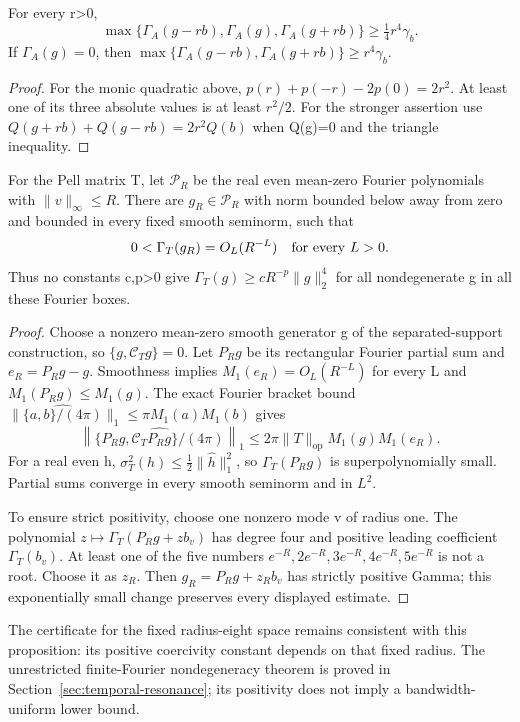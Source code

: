 \begin{proposition}
For every r>0,
\[
 \max\{\Gamma_A(g-rb),\Gamma_A(g),\Gamma_A(g+rb)\}
                    \geq \tfrac14r^4\gamma_b.
\]
If $\Gamma_A(g)=0$, then
$\max\{\Gamma_A(g-rb),\Gamma_A(g+rb)\}\geq r^4\gamma_b$.
\end{proposition}
\begin{proof}
For the monic quadratic above, $p(r)+p(-r)-2p(0)=2r^2$. At least one of its
three absolute values is at least $r^2/2$. For the stronger assertion use
$Q(g+rb)+Q(g-rb)=2r^2Q(b)$ when Q(g)=0 and the triangle inequality.
\end{proof}

\begin{proposition}
For the Pell matrix T, let $\mathcal P_R$ be the real even mean-zero Fourier
polynomials with $\|v\|_\infty\leq R$. There are $g_R\in\mathcal P_R$ with
norm bounded below away from zero and bounded in every fixed smooth seminorm,
such that
\[
             0<\Gamma_T(g_R)=O_L(R^{-L})\quad\hbox{for every }L>0.
\]
Thus no constants c,p>0 give $\Gamma_T(g)\geq cR^{-p}\|g\|_2^4$ for all
nondegenerate g in all these Fourier boxes.
\end{proposition}
\begin{proof}
Choose a nonzero mean-zero smooth generator g of the separated-support
construction, so $\{g,\mathcal C_Tg\}=0$. Let $P_Rg$ be its rectangular
Fourier partial sum and $e_R=P_Rg-g$. Smoothness implies
$M_1(e_R)=O_L(R^{-L})$ for every L and $M_1(P_Rg)\leq M_1(g)$.
The exact Fourier bracket bound
$\|\widehat{\{a,b\}/(4\pi)}\|_1\leq\pi M_1(a)M_1(b)$ gives
\[
 \left\|\widehat{\{P_Rg,\mathcal C_TP_Rg\}/(4\pi)}\right\|_1
       \leq2\pi\|T\|_{\mathrm{op}}M_1(g)M_1(e_R).
\]
For a real even h, $\sigma_T^2(h)\leq\tfrac12\|\widehat h\|_1^2$, so
$\Gamma_T(P_Rg)$ is superpolynomially small. Partial sums converge in every
smooth seminorm and in $L^2$.

To ensure strict positivity, choose one nonzero mode v of radius one.
The polynomial $z\mapsto\Gamma_T(P_Rg+zb_v)$ has degree four and positive
leading coefficient $\Gamma_T(b_v)$. At least one of the five numbers
$e^{-R},2e^{-R},3e^{-R},4e^{-R},5e^{-R}$ is not a root. Choose it as $z_R$.
Then $g_R=P_Rg+z_Rb_v$ has strictly positive Gamma; this exponentially small
change preserves every displayed estimate. 
\end{proof}

The certificate for the fixed radius-eight space remains consistent with this
proposition: its positive coercivity constant depends on that fixed radius.
The unrestricted finite-Fourier nondegeneracy theorem is proved in
Section~\ref{sec:temporal-resonance}; its positivity does not imply a
bandwidth-uniform lower bound.
